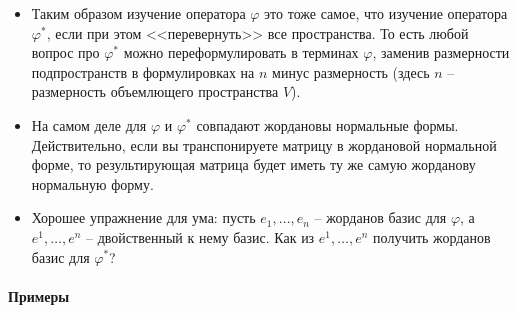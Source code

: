 \begin{itemize}
\item Таким образом изучение оператора $\varphi$ это тоже самое, что изучение оператора $\varphi^*$, если при этом <<перевернуть>> все пространства.
То есть любой вопрос про $\varphi^*$ можно переформулировать в терминах $\varphi$, заменив размерности подпространств в формулировках на $n$ минус размерность (здесь $n$ -- размерность объемлющего пространства $V$).

\item На самом деле для $\varphi$ и $\varphi^*$ совпадают жордановы нормальные формы.
Действительно, если вы транспонируете матрицу в жордановой нормальной форме, то результирующая матрица будет иметь ту же самую жорданову нормальную форму.

\item Хорошее упражнение для ума: пусть $e_1,\ldots,e_n$ -- жорданов базис для $\varphi$, а $e^1,\ldots,e^n$ -- двойственный к нему базис.
Как из $e^1,\ldots,e^n$ получить жорданов базис для $\varphi^*$?
\end{itemize}

\paragraph{Примеры}

